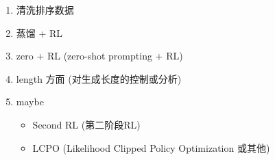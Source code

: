 \documentclass{pkuthesis}
\begin{document}
\begin{enumerate}[label=\arabic*.]
\begin{enumerate}[label=\arabic*.]
        \item 清洗排序数据
        \item 蒸馏 + RL
        \item zero + RL (zero-shot prompting + RL)
        \item length 方面 (对生成长度的控制或分析)
        \item maybe
        \begin{itemize}
            \item Second RL (第二阶段RL)
            \item LCPO (Likelihood Clipped Policy Optimization 或其他)
        \end{itemize}
    \end{enumerate}
\end{enumerate}

\printbibliography
\end{document}
